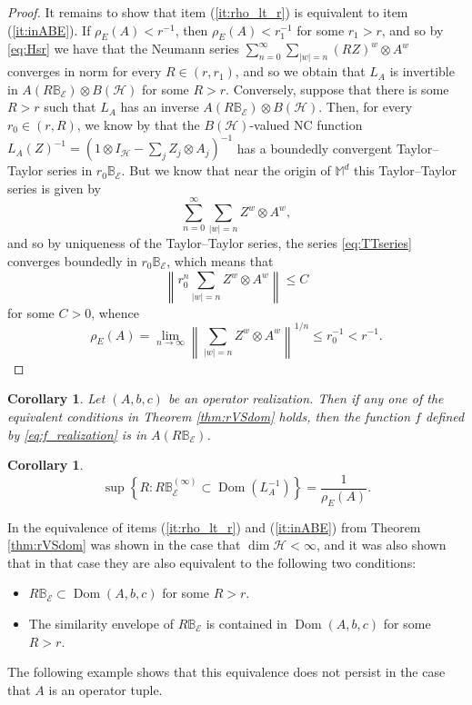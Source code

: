 \documentclass[12pt]{amsart}
\numberwithin{equation}{section}
\newtheorem{corollary}[theorem]{Corollary}
\theoremstyle{definition}
\newcommand{\be}{\begin{equation}}
\newcommand{\ee}{\end{equation}}
\newcommand{\cE}{\mathcal{E}}
\newcommand{\cH}{\mathcal{H}}
\newcommand{\bB}{\mathbb{B}}
\newcommand{\bM}{\mathbb{M}}
\newcommand{\dom}{\operatorname{Dom}}
\begin{document}
\begin{proof}
    It remains to show that item (\ref{it:rho_lt_r}) is equivalent to item (\ref{it:inABE}). 
    If $\rho_E(A) < r^{-1}$, then $\rho_E(A) < r_1^{-1}$ for some $r_1>r$, and so by \eqref{eq:Hsr} we have that the Neumann series $\sum_{n=0}^\infty \sum_{|w|=n} (RZ)^w \otimes A^w$ converges in norm for every $R \in (r,r_1)$, and so we obtain that $L_A$ is invertible in $A(R\bB_\cE) \otimes B(\cH)$ for some $R>r$. 
    Conversely, suppose that there is some $R > r$ such that $L_A$ has an inverse $A(R\bB_\cE) \otimes B(\cH)$. 
    Then, for every $r_0 \in (r,R)$, we know by \cite{KVV} that the $B(\cH)$-valued NC function $L_A(Z)^{-1} = \left(1 \otimes I_\cH - \sum_j Z_j \otimes A_j \right)^{-1}$ has a boundedly convergent Taylor--Taylor series in $r_0 \bB_\cE$. But we know that near the origin of $\bM^d$ this Taylor--Taylor series is given by 
    \be\label{eq:TTseries}
    \sum_{n=0}^\infty \sum_{|w|=n} Z^w \otimes A^w, 
    \ee 
    and so by uniqueness of the Taylor--Taylor series, the series \eqref{eq:TTseries} converges boundedly in $r_0\bB_\cE$, which means that
    \[
    \left\| r_0^n \sum_{|w|=n} Z^w \otimes A^w \right\| \leq C
    \]
    for some $C>0$, whence 
    \[
    \rho_E(A) = \lim_{n \to \infty} \left\|\sum_{|w|=n} Z^w \otimes A^w \right\|^{1/n} \leq r_0^{-1} < r^{-1}.  
    \]
\end{proof}

\begin{corollary}
    Let $(A,b,c)$ be an operator realization. Then if any one of the equivalent conditions in Theorem \ref{thm:rVSdom} holds, then the function $f$ defined by \eqref{eq:f_realization} is in $A(R\bB_\cE)$. 
\end{corollary}

\begin{corollary}
    \[
    \sup\left\{R : R\bB^{(\infty)}_\cE \subset \dom(L_A^{-1})\right\} = \frac{1}{\rho_E(A)} . 
    \]
\end{corollary}

In \cite[Theorem 3.4]{shalsham2025spectral} the equivalence of items (\ref{it:rho_lt_r}) and (\ref{it:inABE}) from Theorem \ref{thm:rVSdom} was shown in the case that $\dim \cH < \infty$, and it was also shown that in that case they are also equivalent to the following two conditions: 
\begin{itemize}
          \item[$(2')$] $R\bB_\cE\subset \dom(A,b,c)$ for some $R > r$. \label{it:RBE}
        \item[$(3')$] The similarity envelope of $R\bB_\cE$ is contained in $\dom(A,b,c)$ for some $R > r$. \label{it:RBE_sim}
\end{itemize}
The following example shows that this equivalence does not persist in the case that $A$ is an operator tuple. 
\end{document}

